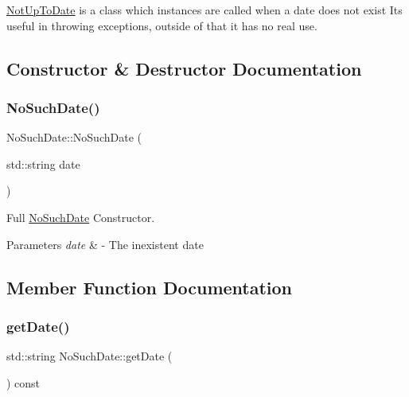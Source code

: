\hyperlink{classNotUpToDate}{Not\+Up\+To\+Date} is a class which instances are called when a date does not exist Its useful in throwing exceptions, outside of that it has no real use. 

\subsection{Constructor \& Destructor Documentation}
\mbox{\label{classNoSuchDate_a0cad1c9e0d0a034a885b2529d6f79811}} 
\subsubsection{\texorpdfstring{No\+Such\+Date()}{NoSuchDate()}}
{\footnotesize\ttfamily No\+Such\+Date\+::\+No\+Such\+Date (\begin{DoxyParamCaption}\item[{std\+::string}]{date }\end{DoxyParamCaption})\hspace{0.3cm}{\ttfamily [inline]}}



Full \hyperlink{classNoSuchDate}{No\+Such\+Date} Constructor. 


\begin{DoxyParams}{Parameters}
{\em date} & -\/ The inexistent date \\
\hline
\end{DoxyParams}


\subsection{Member Function Documentation}
\mbox{\label{classNoSuchDate_ad78fefa7d990af927c46096722a00f2c}} 
\subsubsection{\texorpdfstring{get\+Date()}{getDate()}}
{\footnotesize\ttfamily std\+::string No\+Such\+Date\+::get\+Date (\begin{DoxyParamCaption}{ }\end{DoxyParamCaption}) const\hspace{0.3cm}{\ttfamily [inline]}}



